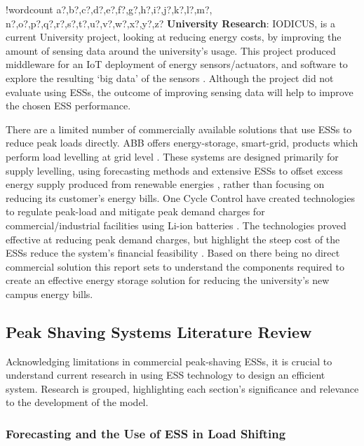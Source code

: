 \documentclass[fontsize=9.5pt]{extarticle}
\numberwithin{figure}{section} %
\newcounter{words}
\newenvironment{counted}{%
  \setcounter{words}{0}
  \SearchList!{wordcount}{\stepcounter{words}}
    {a?,b?,c?,d?,e?,f?,g?,h?,i?,j?,k?,l?,m?,
    n?,o?,p?,q?,r?,s?,t?,u?,v?,w?,x?,y?,z?}
  \UndoBoundary{'}
  \SearchOrder{p;}}{%
  \StopSearching}
\begin{document}
\begin{counted}
\textbf{University Research}: IODICUS, is a current University project,
looking at reducing energy costs, by improving the amount of sensing
data around the university's usage. This project produced middleware for
an IoT deployment of energy sensors/actuators, and software to explore
the resulting `big data' of the sensors \cite{priestemail}. Although the
project did not evaluate using ESSs, the outcome of improving sensing
data will help to improve the chosen ESS performance.

There are a limited number of commercially available solutions that use
ESSs to reduce peak loads directly. ABB offers energy-storage,
smart-grid, products which perform load levelling at grid level
\cite{abbpeakshave}. These systems are designed primarily for supply
levelling, using forecasting methods and extensive ESSs to offset excess
energy supply produced from renewable energies \cite{5559470}, rather
than focusing on reducing its customer's energy bills. One Cycle Control
have created technologies to regulate peak-load and mitigate peak demand
charges for commercial/industrial facilities using Li-ion batteries
\cite{peakload38:online}. The technologies proved effective at reducing
peak demand charges, but highlight the steep cost of the ESSs reduce the
system's financial feasibility \cite{Demonstr51:online}. Based on there
being no direct commercial solution this report sets to understand the
components required to create an effective energy storage solution for
reducing the university's new campus energy bills.

\subsection{Peak Shaving Systems Literature
Review}\label{peak-shaving-systems-literature-review}

Acknowledging limitations in commercial peak-shaving ESSs, it is crucial
to understand current research in using ESS technology to design an
efficient system. Research is grouped, highlighting each section's
significance and relevance to the development of the model.

\subsubsection{Forecasting and the Use of ESS in Load
Shifting}\label{forecasting-and-the-use-of-ess-in-load-shifting}


\end{counted}
\end{document}
